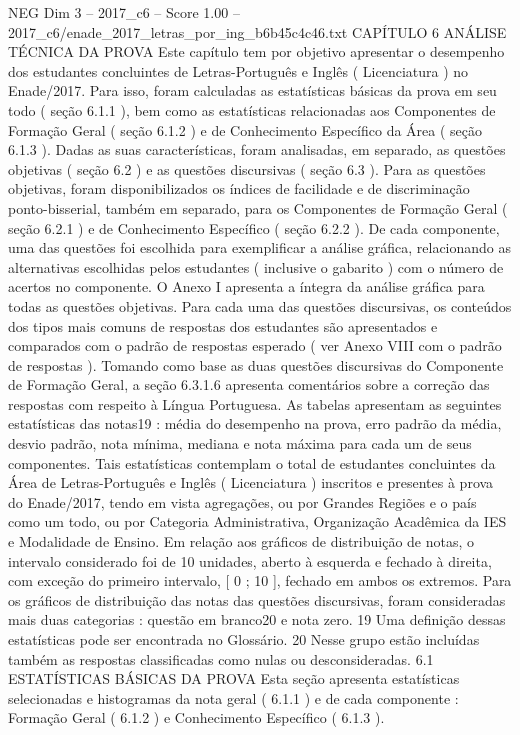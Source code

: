 \begin{textsample}{NEG Dim 3 – 2017\_c6 – Score 1.00 – 2017\_c6/enade\_2017\_letras\_por\_ing\_b6b45c4c46.txt}  \label{ex:f3_neg_091}
CAPÍTULO 6 ANÁLISE TÉCNICA DA PROVA Este capítulo tem por objetivo apresentar o desempenho dos estudantes concluintes de Letras-Português e Inglês ( Licenciatura ) no Enade/2017.
Para isso, foram calculadas as estatísticas básicas da prova em seu todo ( seção 6.1.1 ), bem como as estatísticas relacionadas aos Componentes de Formação Geral ( seção 6.1.2 ) e de Conhecimento Específico da Área ( seção 6.1.3 ).
Dadas as suas características, foram analisadas, em separado, as questões objetivas ( seção 6.2 ) e as questões discursivas ( seção 6.3 ).
Para as questões objetivas, foram disponibilizados os índices de facilidade e de discriminação ponto-bisserial, também em separado, para os Componentes de Formação Geral ( seção 6.2.1 ) e de Conhecimento Específico ( seção 6.2.2 ).
De cada componente, uma das questões foi escolhida para exemplificar a análise gráfica, relacionando as alternativas escolhidas pelos estudantes ( inclusive o gabarito ) com o número de acertos no componente.
O Anexo I apresenta a íntegra da análise gráfica para todas as questões objetivas.
Para cada uma das questões discursivas, os conteúdos dos tipos mais comuns de respostas dos estudantes são apresentados e comparados com o padrão de respostas esperado ( ver Anexo VIII com o padrão de respostas ).
Tomando como base as duas questões discursivas do Componente de Formação Geral, a seção 6.3.1.6 apresenta comentários sobre a correção das respostas com respeito à Língua Portuguesa.
As tabelas apresentam as seguintes estatísticas das notas19 : média do desempenho na prova, erro padrão da média, desvio padrão, nota mínima, mediana e nota máxima para cada um de seus componentes.
Tais estatísticas contemplam o total de estudantes concluintes da Área de Letras-Português e Inglês ( Licenciatura ) inscritos e presentes à prova do Enade/2017, tendo em vista agregações, ou por Grandes Regiões e o país como um todo, ou por Categoria Administrativa, Organização Acadêmica da IES e Modalidade de Ensino.
Em relação aos gráficos de distribuição de notas, o intervalo considerado foi de 10 unidades, aberto à esquerda e fechado à direita, com exceção do primeiro intervalo, [ 0 ; 10 ], fechado em ambos os extremos.
Para os gráficos de distribuição das notas das questões discursivas, foram consideradas mais duas categorias : questão em branco20 e nota zero. 19 Uma definição dessas estatísticas pode ser encontrada no Glossário. 20 Nesse grupo estão incluídas também as respostas classificadas como nulas ou desconsideradas. 6.1 ESTATÍSTICAS BÁSICAS DA PROVA Esta seção apresenta estatísticas selecionadas e histogramas da nota geral ( 6.1.1 ) e de cada componente : Formação Geral ( 6.1.2 ) e Conhecimento Específico ( 6.1.3 ).

\end{textsample}
